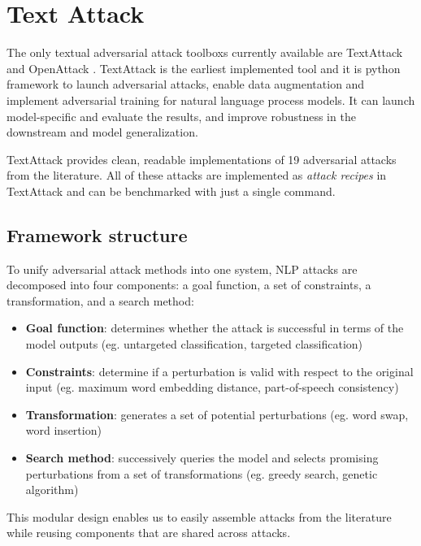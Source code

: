 \section{Text Attack}\label{sec:text-attack}
The only textual adversarial attack toolboxs currently available are TextAttack \cite{journals/corr/abs-2005-05909} and OpenAttack \cite{journals/corr/abs-2009-09191}.
TextAttack is the earliest implemented tool and it is python framework to launch adversarial attacks, enable data augmentation and implement adversarial training for natural language process models. 
It can launch model-specific and evaluate the results, and improve robustness in the downstream and model generalization. 

TextAttack provides clean, readable implementations of 19 adversarial attacks from the literature.
All of these attacks are implemented as \emph{attack recipes} in TextAttack and can be benchmarked with just a single command.

\subsection{Framework structure}\label{subsec:framework-structure}

To unify adversarial attack methods into one
system, NLP attacks are decomposed into four components: a goal function, a set of constraints, a transformation, and a search method:
\begin{itemize}
    \item \textbf{Goal function}: determines whether the attack is successful in terms of the model outputs (eg. untargeted classification, targeted classification)
    \item \textbf{Constraints}: determine if a perturbation is valid with respect to the original input (eg. maximum word embedding distance, part-of-speech consistency)
    \item \textbf{Transformation}: generates a set of potential perturbations (eg. word swap, word insertion)
    \item \textbf{Search method}: successively queries the model and selects promising perturbations from a set of transformations (eg. greedy search, genetic algorithm)
\end{itemize}

This modular design enables us to easily assemble attacks from the literature while reusing components that are shared across attacks.

